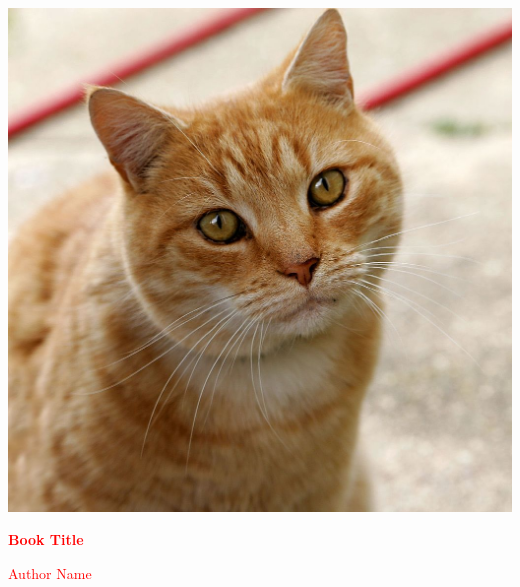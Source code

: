 \documentclass{book}
\begin{document}
\frontmatter
\thispagestyle{empty}
\begin{titlepage}
    \centering
    \vspace*{4cm}
    \includegraphics[width=\paperwidth,
                    height=\paperheight,
                    keepaspectratio]{cover_image.jpg} %
    
    \vfill
    
    \Huge\bfseries
    \textcolor{red}{\sffamily Book Title}
    
    \vspace{1cm}
    
    \Large
    \textcolor{red}{\sffamily Author Name}
    
\end{titlepage}
\restoregeometry

\mainmatter

\end{document}
